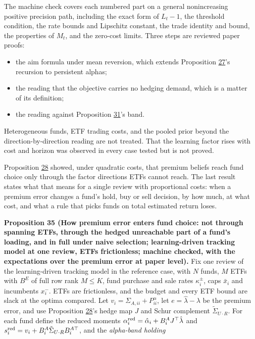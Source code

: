 \documentclass[11pt]{article}
\begin{document}
The machine check covers each numbered part on a general nonincreasing
positive precision path, including the exact form of \(L_t-1\), the
threshold condition, the rate bounds and Lipschitz constant, the trade
identity and bound, the properties of \(M_t\), and the zero-cost limits.
Three steps are reviewed paper proofs:

\begin{itemize}
  \item the aim formula under mean reversion, which extends Proposition \hyperref[res:Proposition-27]{27}'s
  recursion to persistent alphas;
  \item the reading that the objective carries no hedging demand, which is
  a matter of its definition;
  \item the reading against Proposition \hyperref[res:Proposition-31]{31}'s band.
\end{itemize}

Heterogeneous funds, ETF trading costs, and the pooled prior beyond
the direction-by-direction reading are not treated. That the learning
factor rises with cost and horizon was observed in every case tested
but is not proved.

Proposition \hyperref[res:Proposition-28]{28} showed, under quadratic costs, that premium beliefs
reach fund choice only through the factor directions ETFs cannot
reach. The last result states what that means for a single review
with proportional costs: when a premium error changes a fund's hold,
buy or sell decision, by how much, at what cost, and what a rule that
picks funds on total estimated return loses.

\label{res:Proposition-35}
\textbf{Proposition 35 (How premium error enters fund choice: not through spanning ETFs, through the hedged unreachable part of a fund's loading, and in full under naive selection; learning-driven tracking model at one review, ETFs frictionless; machine checked, with the expectations over the premium error at paper level).}
Fix one review of the learning-driven tracking model in the reference
case, with \(N\) funds, \(M\) ETFs with \(B^E\) of full row rank \(M\leq K\), fund
purchase and sale rates \(\kappa^\pm_i\), caps \(\bar x_i\) and incumbents \(x^-_i\).
ETFs are frictionless, and the budget and every ETF bound are slack at
the optima compared. Let \(v_i=\Sigma_{A,ii}+P^\alpha_{ii}\), let \(e=\hat\lambda-\lambda\) be
the premium error, and use Proposition \hyperref[res:Proposition-28]{28}'s hedge map \(J\) and Schur
complement \(\tilde\Sigma_{U\cdot R}\). For each fund define the reduced moments
\(\alpha^{\rm red}_i=\hat\alpha_i+B^A_iJ^\top\hat\lambda\) and
\(s^{\rm red}_i=v_i+B^A_i\tilde\Sigma_{U\cdot R}B^{A\top}_i\), and the \emph{alpha-band holding}
\end{document}
